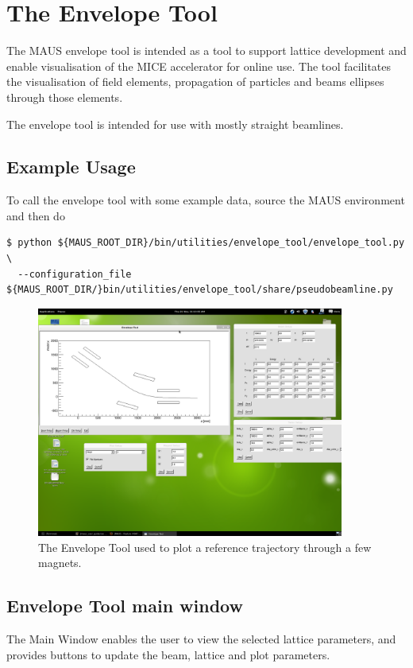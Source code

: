 \chapter{The Envelope Tool}

The MAUS envelope tool is intended as a tool to support lattice development and
enable visualisation of the MICE accelerator for online use. The tool 
facilitates the visualisation of field elements, propagation of particles and
beams ellipses through those elements.

The envelope tool is intended for use with mostly straight beamlines.

\section{Example Usage}
To call the envelope tool with some example data, source the MAUS environment 
and then do

\begin{verbatim}
$ python ${MAUS_ROOT_DIR}/bin/utilities/envelope_tool/envelope_tool.py \
  --configuration_file ${MAUS_ROOT_DIR/}bin/utilities/envelope_tool/share/pseudobeamline.py
\end{verbatim}

\begin{figure}[!htb]
\centering
\includegraphics[width=0.9\textwidth]{envelope_tool.png}
\caption{The Envelope Tool used to plot a reference trajectory through a few magnets.}
\end{figure}

\section{Envelope Tool main window}
The Main Window enables the user to view the selected lattice parameters, and
provides buttons to update the beam, lattice and plot parameters.

